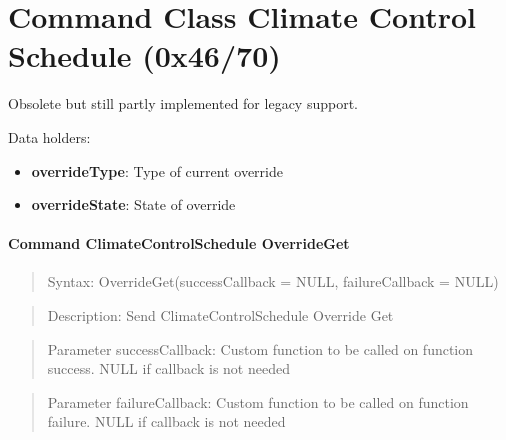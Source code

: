 \section{Command Class Climate Control Schedule (0x46/70)}

Obsolete but still partly implemented for legacy support.
\newline

\noindent
Data holders:

\begin{itemize}
\item \textbf{overrideType}: Type of current override
\item \textbf{overrideState}: State of override
\end{itemize}

\paragraph{Command ClimateControlSchedule OverrideGet}
\begin{quote}Syntax: OverrideGet(successCallback = NULL, failureCallback = NULL)\end{quote}
\begin{quote}Description: Send ClimateControlSchedule Override Get\end{quote}
\begin{quote}Parameter successCallback: Custom function to be called on function success. NULL if callback is not needed\end{quote}
\begin{quote}Parameter failureCallback: Custom function to be called on function failure. NULL if callback is not needed\end{quote}


